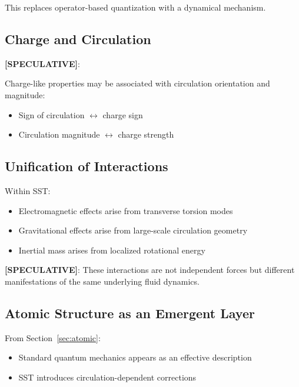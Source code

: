         This replaces operator-based quantization with a dynamical mechanism.
    
    \subsection{Charge and Circulation}
        
        \textbf{[SPECULATIVE]}:
        
        Charge-like properties may be associated with circulation orientation and magnitude:
        
        \begin{itemize}
            \item Sign of circulation $\leftrightarrow$ charge sign
            \item Circulation magnitude $\leftrightarrow$ charge strength
        \end{itemize}
    
    \subsection{Unification of Interactions}
        
        Within SST:
        
        \begin{itemize}
            \item Electromagnetic effects arise from transverse torsion modes
            \item Gravitational effects arise from large-scale circulation geometry
            \item Inertial mass arises from localized rotational energy
        \end{itemize}
        
        \textbf{[SPECULATIVE]}:
        These interactions are not independent forces but different manifestations of the same underlying fluid dynamics.
    
    \subsection{Atomic Structure as an Emergent Layer}
        
        From Section~\ref{sec:atomic}:
        
        \begin{itemize}
            \item Standard quantum mechanics appears as an effective description
            \item SST introduces circulation-dependent corrections
        \end{itemize}
        
